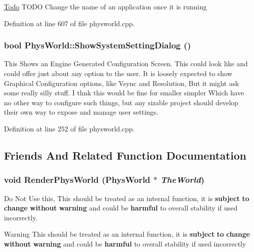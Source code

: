 \begin{Desc}
\item[\hyperlink{todo__todo000011}{Todo}]TODO Change the name of an application once it is running \end{Desc}


Definition at line 607 of file physworld.cpp.\hypertarget{classPhysWorld_a9b83f04907443c6307956a3c4089e3ca}{
\subsubsection[{ShowSystemSettingDialog}]{\setlength{\rightskip}{0pt plus 5cm}bool PhysWorld::ShowSystemSettingDialog ()}}
\label{db/df5/classPhysWorld_a9b83f04907443c6307956a3c4089e3ca}


This Shows an Engine Generated Configuration Screen. This could look like and could offer just about any option to the user. It is loosely expected to show Graphical Configuration options, like Vsync and Resolution, But it might ask some really silly stuff. I thnk this would be fine for smaller simpler Which have no other way to configure such things, but any sizable project should develop their own way to expose and manage user settings. 

Definition at line 252 of file physworld.cpp.

\subsection{Friends And Related Function Documentation}
\hypertarget{classPhysWorld_a54ca2a75bbccb9b2129f434874f1e693}{
\subsubsection[{RenderPhysWorld}]{\setlength{\rightskip}{0pt plus 5cm}void RenderPhysWorld ({\bf PhysWorld} $\ast$ {\em TheWorld})}}
\label{db/df5/classPhysWorld_a54ca2a75bbccb9b2129f434874f1e693}


Do Not Use this, This should be treated as an internal function, it is {\bfseries subject} {\bfseries to} {\bfseries change} {\bfseries without} {\bfseries warning} and could be {\bfseries harmful} to overall stability if used incorrectly. \begin{DoxyWarning}{Warning}
This should be treated as an internal function, it is {\bfseries subject} {\bfseries to} {\bfseries change} {\bfseries without} {\bfseries warning} and could be {\bfseries harmful} to overall stability if used incorrectly 
\end{DoxyWarning}


